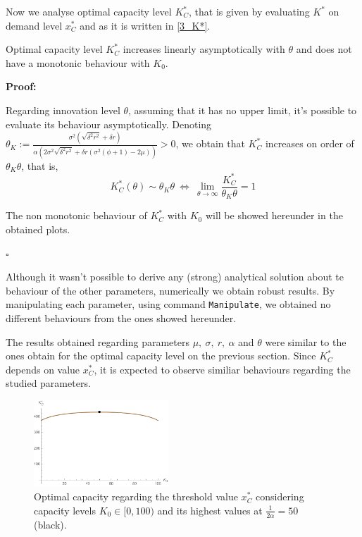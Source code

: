 Now we analyse optimal capacity level $K^*_C$, that is given by evaluating $K^*$ on demand level $x^*_C$ and as it is written in \eqref{3_K*}.

\begin{prop}
Optimal capacity level $K^*_C$ increases linearly asymptotically with $\theta$ and does not have a monotonic behaviour with $K_0$. 
\end{prop}

\textbf{Proof:}

Regarding innovation level $\theta$, assuming that it has no upper limit, it's possible to evaluate its behaviour asymptotically. Denoting $\theta_K:=\frac{\sigma ^2 \left(\sqrt{\delta ^2 r^2}+\delta  r\right)}{\alpha  \left(2 \sigma ^2 \sqrt{\delta ^2 r^2}+\delta  r \left(\sigma ^2 (\phi +1)-2 \mu \right)\right)}>0$, we obtain that $K^*_C$ increases on order of $\theta_K \theta$, that is,
$$K^*_C(\theta) \sim \theta_K \theta \ \Leftrightarrow \ \lim_{\theta \to \infty}  \frac{K^*_C}{\theta_K \theta}=1 $$


The non monotonic behaviour of $K^*_C$ with $K_0$ will be showed hereunder in the obtained plots.
\begin{flushright}
	$\square$
\end{flushright}

Although it wasn't possible to derive any (strong) analytical solution about te behaviour of the other parameters, numerically we obtain robust results. By manipulating each parameter, using command \texttt{Manipulate}, we obtained no different behaviours from the ones showed hereunder.

The results obtained regarding parameters $\mu, \ \sigma,\ r, \ \alpha$ and $\theta$  were similar to the ones obtain for the optimal capacity level on the previous section.  Since $K^*_C$ depends on value $x_C^*$, it is expected to observe similiar behaviours regarding the studied parameters. 


\begin{figure}[!htb]
	\centering
	\includegraphics[width=0.45\textwidth]{Prob2_CapOpt/koptx_k0.pdf}
	\caption{Optimal capacity regarding the threshold value $x^*_C$ considering capacity levels $K_0 \in [0, 100)$ and its highest values at $\frac{1}{2 \alpha}=50$ (black).}
	\label{fig:2_k0}
\end{figure}

